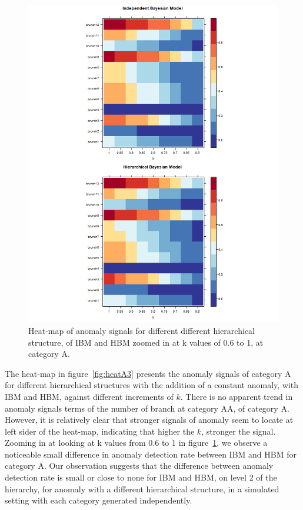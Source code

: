		\begin{figure}[!h]
			\centering
			\includegraphics[width=1\linewidth]{../../R-codes/JAGS/plots/sim2/heatA2}
			\caption{Heat-map of anomaly signals for different different hierarchical structure, of IBM and HBM zoomed in at k values of 0.6 to 1, at category A.}
			\label{fig:heatA3h}
		\end{figure}
		
		\newpage
		
		The heat-map in figure~\ref{fig:heatA3} presents the anomaly signals of category A for different hierarchical structures with the addition of a constant anomaly, with IBM and HBM, against different increments of $k$. There is no apparent trend in anomaly signals terms of the number of branch at category AA, of category A. However,  it is relatively clear that stronger signals of anomaly seem to locate at left sider of the heat-map, indicating that higher the $k$, stronger the signal. Zooming in at looking at k values from 0.6 to 1 in figure~\ref{fig:heatA3h}, we observe a noticeable small difference in anomaly detection rate between IBM and HBM for category A. Our observation suggests that the difference between anomaly detection rate is small or close to none for IBM and HBM, on level 2 of the hierarchy, for anomaly with a different hierarchical structure, in a simulated setting with each category generated independently. 
		
